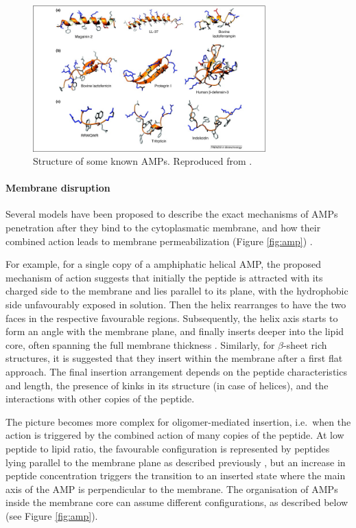 \begin{figure}[t!]
\begin{center}
\includegraphics[width = 0.8\textwidth]{1introduction/pics/AMP_many.jpg}
\caption[Structure of some known AMPs.]{Structure of some known AMPs. Reproduced from \citep{Nguyen2011}.} \label{fig:amp_structure}
\end{center}
\end{figure}


\paragraph{Membrane disruption} Several models have been proposed to describe the exact mechanisms of AMPs penetration after they bind to the cytoplasmatic membrane, and how their combined action leads to membrane permeabilization (Figure \ref{fig:amp}) \citep{Brogden2005,Nguyen2011}.

For example, for a single copy of a amphiphatic helical AMP, the proposed mechanism of action suggests that initially the peptide is attracted with its charged side to the membrane and lies parallel to its plane, with the hydrophobic side unfavourably exposed in solution. Then the helix rearranges to have the two faces in the respective favourable regions. Subsequently, the helix axis starts to form an angle with the membrane plane, and finally inserts deeper into the lipid core, often spanning the full membrane thickness \citep{Ebenhan2014}.
%
Similarly, for $\beta$-sheet rich structures, it is suggested that they insert within the membrane after a first flat approach.
%
The final insertion arrangement depends on the peptide characteristics and length, the presence of kinks in its structure (in case of helices), and the interactions with other copies of the peptide.

The picture becomes more complex for oligomer-mediated insertion, i.e.\ when the action is triggered by the combined action of many copies of the peptide.
%
At low peptide to lipid ratio, the favourable configuration is represented by peptides lying parallel to the membrane plane as described previously \citep{Yang2001}, but an increase in peptide concentration triggers the transition to an inserted state where the main axis of the AMP is perpendicular to the membrane. The organisation of AMPs inside the membrane core can assume different configurations, as described below \citep{Brogden2005,Nguyen2011,Ebenhan2014,Mahlapuu2016} (see Figure \ref{fig:amp}).

